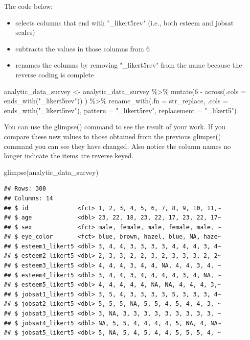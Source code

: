 \documentclass[
]{krantz}
\makeatletter
\newenvironment{Shaded}{\begin{snugshade}}{\end{snugshade}}
\newcommand{\AttributeTok}[1]{\textcolor[rgb]{0.61,0.61,0.61}{#1}}
\newcommand{\DecValTok}[1]{\textcolor[rgb]{0.06,0.06,0.06}{#1}}
\newcommand{\FunctionTok}[1]{\textcolor[rgb]{0,0,0}{#1}}
\newcommand{\NormalTok}[1]{#1}
\newcommand{\OtherTok}[1]{\textcolor[rgb]{0.37,0.37,0.37}{#1}}
\newcommand{\SpecialCharTok}[1]{\textcolor[rgb]{0,0,0}{#1}}
\newcommand{\StringTok}[1]{\textcolor[rgb]{0.5,0.5,0.5}{#1}}
\providecommand{\tightlist}{%
  \setlength{\itemsep}{0pt}\setlength{\parskip}{0pt}}
\newenvironment{kframe}{%
\medskip{}
\setlength{\fboxsep}{.8em}
 \def\at@end@of@kframe{}%
 \ifinner\ifhmode%
  \def\at@end@of@kframe{\end{minipage}}%
  \begin{minipage}{\columnwidth}%
 \fi\fi%
 \def\FrameCommand##1{\hskip\@totalleftmargin \hskip-\fboxsep
 \colorbox{shadecolor}{##1}\hskip-\fboxsep
     \hskip-\linewidth \hskip-\@totalleftmargin \hskip\columnwidth}%
 \MakeFramed {\advance\hsize-\width
   \@totalleftmargin\z@ \linewidth\hsize
   \@setminipage}}%
 {\par\unskip\endMakeFramed%
 \at@end@of@kframe}
\renewenvironment{Shaded}{\begin{kframe}}{\end{kframe}}
\makeatother
\begin{document}
The code below:

\begin{itemize}
\tightlist
\item
  selects columns that end with "\_likert5rev" (i.e., both esteem and jobsat scales)
\item
  subtracts the values in those columns from 6
\item
  renames the columns by removing "\_likert5rev" from the name because the reverse coding is complete
\end{itemize}

\begin{Shaded}
\begin{Highlighting}[]
\NormalTok{analytic\_data\_survey }\OtherTok{\textless{}{-}}\NormalTok{ analytic\_data\_survey }\SpecialCharTok{\%\textgreater{}\%} 
  \FunctionTok{mutate}\NormalTok{(}\DecValTok{6} \SpecialCharTok{{-}} \FunctionTok{across}\NormalTok{(}\AttributeTok{.cols =} \FunctionTok{ends\_with}\NormalTok{(}\StringTok{"\_likert5rev"}\NormalTok{)) ) }\SpecialCharTok{\%\textgreater{}\%} 
  \FunctionTok{rename\_with}\NormalTok{(}\AttributeTok{.fn =}\NormalTok{ str\_replace,}
              \AttributeTok{.cols =} \FunctionTok{ends\_with}\NormalTok{(}\StringTok{"\_likert5rev"}\NormalTok{),}
              \AttributeTok{pattern =} \StringTok{"\_likert5rev"}\NormalTok{,}
              \AttributeTok{replacement =} \StringTok{"\_likert5"}\NormalTok{)}
\end{Highlighting}
\end{Shaded}

You can use the glimpse() command to see the result of your work. If you compare these new values to those obtained from the previous glimpse() command you can see they have changed. Also notice the column names no longer indicate the items are reverse keyed.

\begin{Shaded}
\begin{Highlighting}[]
\FunctionTok{glimpse}\NormalTok{(analytic\_data\_survey)}
\end{Highlighting}
\end{Shaded}

\begin{verbatim}
## Rows: 300
## Columns: 14
## $ id              <fct> 1, 2, 3, 4, 5, 6, 7, 8, 9, 10, 11,~
## $ age             <dbl> 23, 22, 18, 23, 22, 17, 23, 22, 17~
## $ sex             <fct> male, female, male, female, male, ~
## $ eye_color       <fct> blue, brown, hazel, blue, NA, haze~
## $ esteem1_likert5 <dbl> 3, 4, 4, 3, 3, 3, 3, 4, 4, 4, 3, 4~
## $ esteem2_likert5 <dbl> 2, 3, 3, 2, 2, 3, 2, 3, 3, 3, 2, 2~
## $ esteem3_likert5 <dbl> 4, 4, 4, 3, 4, 4, NA, 4, 4, 3, 4, ~
## $ esteem4_likert5 <dbl> 3, 4, 4, 3, 4, 4, 4, 4, 3, 4, NA, ~
## $ esteem5_likert5 <dbl> 4, 4, 4, 4, 4, NA, NA, 4, 4, 4, 3,~
## $ jobsat1_likert5 <dbl> 3, 5, 4, 3, 3, 3, 3, 5, 3, 3, 3, 4~
## $ jobsat2_likert5 <dbl> 5, 5, 5, NA, 5, 5, 4, 5, 4, 4, 3, ~
## $ jobsat3_likert5 <dbl> 3, NA, 3, 3, 3, 3, 3, 3, 3, 3, 3, ~
## $ jobsat4_likert5 <dbl> NA, 5, 5, 4, 4, 4, 4, 5, NA, 4, NA~
## $ jobsat5_likert5 <dbl> 5, NA, 5, 4, 5, 4, 4, 5, 5, 5, 4, ~
\end{verbatim}
\end{document}
